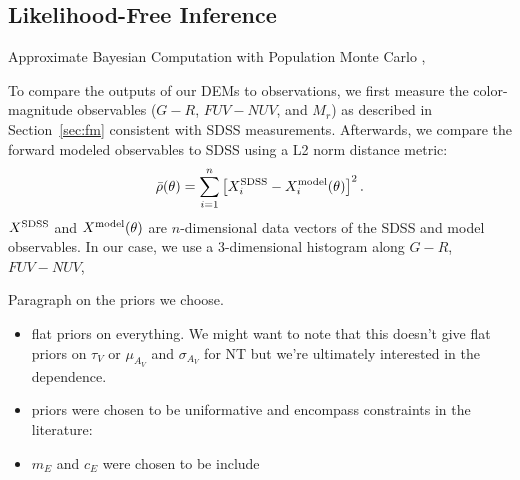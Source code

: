 \subsection{Likelihood-Free Inference} \label{sec:abc}
Approximate Bayesian Computation with Population Monte Carlo \cite{hahn2017a},

To compare the outputs of our DEMs to observations, we first measure the color-magnitude
observables ($G-R$, $FUV-NUV$, and $M_r$) as described in Section~\ref{sec:fm}
consistent with SDSS measurements. Afterwards, we compare the forward modeled
observables to SDSS using a L2 norm distance metric: 
\begin{equation}
    \bar{\rho}(\theta) = \sum\limits_{i=1}^{n} \left[X^{\rm SDSS}_i - X^{\rm model}_i(\theta) \right]^2.
\end{equation}
$X^{\rm SDSS}$ and $X^{\rm model}(\theta)$ are $n$-dimensional data vectors of
the SDSS and model observables. In our case, we use a 3-dimensional histogram
along $G-R$, $FUV-NUV$, 

\cite{ishida2015} 

Paragraph on the priors we choose. 
\begin{itemize}
    \item flat priors on everything. We might want to note that this doesn't
        give flat priors on $\tau_V$ or $\mu_{A_V}$ and $\sigma_{A_V}$ for NT
        but we're ultimately interested in the dependence. 
    \item priors were chosen to be uniformative and encompass constraints in
        the literature:
    \item $m_E$ and $c_E$ were chosen to be include \cite{kriek2013, narayanan2018, tress2018} 
\end{itemize}
